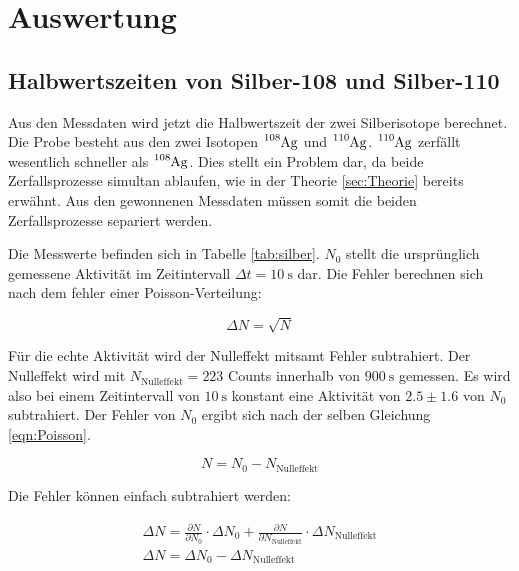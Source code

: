 \section{Auswertung}
\label{sec:Auswertung}

\subsection{Halbwertszeiten von Silber-108 und Silber-110}
\label{sec:Silberhalbwertszeit}

Aus den Messdaten wird jetzt die Halbwertszeit der zwei Silberisotope berechnet.
Die Probe besteht aus den zwei Isotopen $\ce{^{108}Ag}$ und $\ce{^{110}Ag}$.
$\ce{^{110}Ag}$ zerfällt wesentlich schneller als $\ce{^{108}Ag}$.
Dies stellt ein Problem dar, da beide Zerfallsprozesse simultan ablaufen, wie in der Theorie \ref{sec:Theorie} bereits erwähnt.
Aus den gewonnenen Messdaten müssen somit die beiden Zerfallsprozesse separiert werden.

Die Messwerte befinden sich in Tabelle \ref{tab:silber}.
$N_0$ stellt die ursprünglich gemessene Aktivität im Zeitintervall $\Delta t = \SI{10}{\second}$ dar.
Die Fehler berechnen sich nach dem fehler einer Poisson-Verteilung:

\begin{equation}
  \Delta N = \sqrt{N}
  \label{eqn:Poisson}
\end{equation}

Für die echte Aktivität wird der Nulleffekt mitsamt Fehler subtrahiert.
Der Nulleffekt wird mit $N_\text{Nulleffekt} = 223$ Counts innerhalb von $\SI{900}{\second}$ gemessen.
Es wird also bei einem Zeitintervall von $\SI{10}{\second}$ konstant eine Aktivität von $2.5\pm1.6$ von $N_0$ subtrahiert.
Der Fehler von $N_0$ ergibt sich nach der selben Gleichung \eqref{eqn:Poisson}.

\begin{equation}
  N = N_0 - N_{\text{Nulleffekt}}
  \label{eqn:nulleffekt}
\end{equation}

Die Fehler können einfach subtrahiert werden:

\begin{gather}
    \Delta N = \frac{\partial N}{\partial N_0} \cdot \Delta N_0 + \frac{\partial N}{\partial N_{\text{Nulleffekt}}} \cdot \Delta N_{\text{Nulleffekt}} \\
    \Delta N = \Delta N_0 - \Delta N_{\text{Nulleffekt}}
    \label{eqn:nfehler}
\end{gather}


